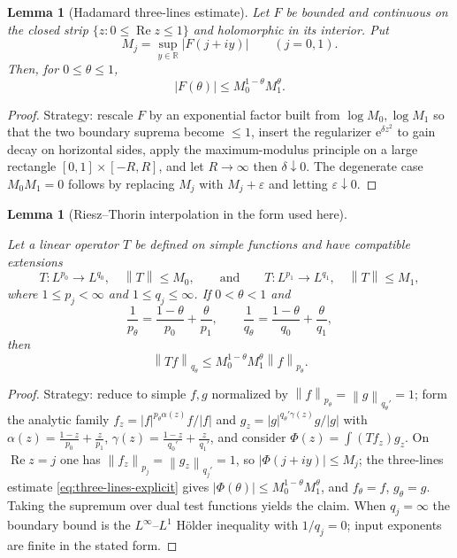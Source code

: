 \documentclass[11pt,oneside]{book}
\providecommand{\uses}[1]{}
\newtheorem{lemma}[theorem]{Lemma}
\theoremstyle{definition}
\theoremstyle{remark}
\newcommand{\R}{\mathbb R}
\newcommand{\1}{\mathbf 1}
\newcommand{\Rea}{\operatorname{Re}}
\newcommand{\norm}[1]{\left\lVert #1\right\rVert}
\newcommand{\abs}[1]{\left\lvert #1\right\rvert}
\newcommand{\e}{\mathrm e}
\newcommand{\eps}{\varepsilon}
\begin{document}
\begin{lemma}[Hadamard three-lines estimate]\label{lem:three-lines-explicit}
Let $F$ be bounded and continuous on the closed strip
$\{z:0\le\Rea z\le1\}$ and holomorphic in its interior. Put
\[
 M_j=\sup_{y\in\R}\abs{F(j+iy)}\qquad(j=0,1).
\]
Then, for $0\le\theta\le1$,
\begin{equation}
 \abs{F(\theta)}\le M_0^{1-\theta}M_1^{\theta}. \label{eq:three-lines-explicit}
\end{equation}
\end{lemma}

\begin{proof}
\uses{}
Strategy: rescale $F$ by an exponential factor built from $\log M_0,\log M_1$ so
that the two boundary suprema become $\le1$, insert the regularizer
$\e^{\delta z^2}$ to gain decay on horizontal sides, apply the maximum-modulus
principle on a large rectangle $[0,1]\times[-R,R]$, and let $R\to\infty$ then
$\delta\downarrow0$. The degenerate case $M_0M_1=0$ follows by replacing $M_j$
with $M_j+\eps$ and letting $\eps\downarrow0$.
\end{proof}

\begin{lemma}[Riesz--Thorin interpolation in the form used here]\label{lem:riesz-thorin-used}
\uses{}
Let a linear operator $T$ be defined on simple functions and have compatible
extensions
\[
 T:L^{p_0}\to L^{q_0},\quad \norm{T}\le M_0,
 \qquad\text{and}\qquad
 T:L^{p_1}\to L^{q_1},\quad \norm{T}\le M_1,
\]
where $1\le p_j<\infty$ and $1\le q_j\le\infty$. If $0<\theta<1$ and
\[
 \frac1{p_\theta}=\frac{1-\theta}{p_0}+\frac{\theta}{p_1},
 \qquad
 \frac1{q_\theta}=\frac{1-\theta}{q_0}+\frac{\theta}{q_1},
\]
then
\[
 \norm{Tf}_{q_\theta}
 \le M_0^{1-\theta}M_1^{\theta}\norm{f}_{p_\theta}.
\]
\end{lemma}

\begin{proof}
\uses{lem:three-lines-explicit}
Strategy: reduce to simple $f,g$ normalized by
$\norm{f}_{p_\theta}=\norm{g}_{q_\theta'}=1$; form the analytic family
$f_z=\abs{f}^{p_\theta\alpha(z)}f/\abs{f}$ and
$g_z=\abs{g}^{q_\theta'\gamma(z)}g/\abs{g}$ with
$\alpha(z)=\tfrac{1-z}{p_0}+\tfrac{z}{p_1}$,
$\gamma(z)=\tfrac{1-z}{q_0'}+\tfrac{z}{q_1'}$, and consider
$\Phi(z)=\int (Tf_z)g_z$. On $\Rea z=j$ one has
$\norm{f_z}_{p_j}=\norm{g_z}_{q_j'}=1$, so $\abs{\Phi(j+iy)}\le M_j$; the
three-lines estimate \eqref{eq:three-lines-explicit} gives
$\abs{\Phi(\theta)}\le M_0^{1-\theta}M_1^{\theta}$, and $f_\theta=f$,
$g_\theta=g$. Taking the supremum over dual test functions yields the claim.
When $q_j=\infty$ the boundary bound is the $L^\infty$--$L^1$ H\"older
inequality with $1/q_j=0$; input exponents are finite in the stated form.
\end{proof}
\end{document}
